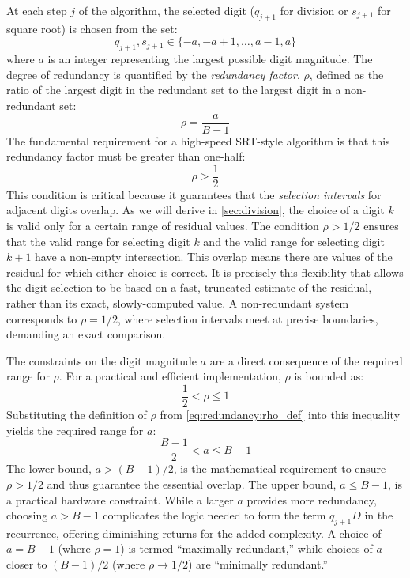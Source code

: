 \documentclass{article}
\begin{document}
At each step $j$ of the algorithm, the selected digit ($q_{j+1}$ for division or $s_{j+1}$ for square root) is chosen from the set:
\begin{equation}
  \label{eq:redundancy:digit_set}
  q_{j+1}, s_{j+1} \in \{-a, -a+1, \dots, a-1, a\}
\end{equation}
where $a$ is an integer representing the largest possible digit magnitude.
The degree of redundancy is quantified by the \emph{redundancy factor}, $\rho$, defined as the ratio of the largest digit in the redundant set to the largest digit in a non-redundant set:
\begin{equation}
  \label{eq:redundancy:rho_def}
  \rho = \frac{a}{B-1}
\end{equation}
The fundamental requirement for a high-speed SRT-style algorithm is that this redundancy factor must be greater than one-half:
\begin{equation}
  \rho > \frac{1}{2}
\end{equation}
This condition is critical because it guarantees that the \emph{selection intervals} for adjacent digits overlap.
As we will derive in \cref{sec:division}, the choice of a digit $k$ is valid only for a certain range of residual values.
The condition $\rho > 1/2$ ensures that the valid range for selecting digit $k$ and the valid range for selecting digit $k+1$ have a non-empty intersection.
This overlap means there are values of the residual for which either choice is correct.
It is precisely this flexibility that allows the digit selection to be based on a fast, truncated estimate of the residual, rather than its exact, slowly-computed value.
A non-redundant system corresponds to $\rho = 1/2$, where selection intervals meet at precise boundaries, demanding an exact comparison.

The constraints on the digit magnitude $a$ are a direct consequence of the required range for $\rho$.
For a practical and efficient implementation, $\rho$ is bounded as:
\begin{equation}
  \label{eq:redundancy:rho_range}
  \frac{1}{2} < \rho \leq 1
\end{equation}
Substituting the definition of $\rho$ from \cref{eq:redundancy:rho_def} into this inequality yields the required range for $a$:
\begin{equation}
  \label{eq:redundancy:a_range}
  \frac{B-1}{2} < a \leq B-1
\end{equation}
The lower bound, $a > (B-1)/2$, is the mathematical requirement to ensure $\rho > 1/2$ and thus guarantee the essential overlap.
The upper bound, $a \leq B-1$, is a practical hardware constraint.
While a larger $a$ provides more redundancy, choosing $a > B-1$ complicates the logic needed to form the term $q_{j+1}D$ in the recurrence, offering diminishing returns for the added complexity.
A choice of $a = B-1$ (where $\rho = 1$) is termed ``maximally redundant,'' while choices of $a$ closer to $(B-1)/2$ (where $\rho \to 1/2$) are ``minimally redundant.''
\end{document}
